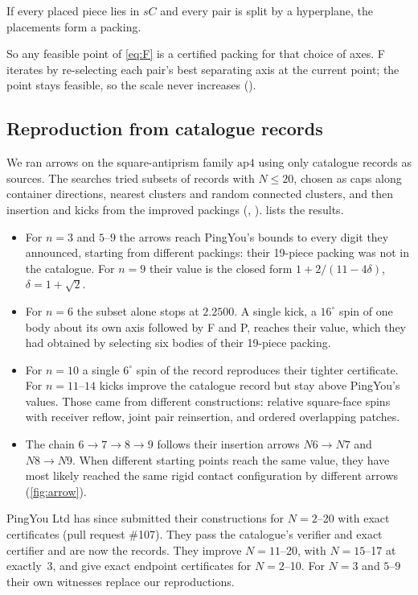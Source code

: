 \documentclass[11pt,a4paper]{article}
\begin{document}
\begin{theorem}\label{thm:sep}
If every placed piece lies in $sC$ and every pair is split by a hyperplane, the placements form a packing.
\end{theorem}

So any feasible point of \eqref{eq:F} is a certified packing for that choice of axes. F iterates by re-selecting each pair's best separating axis at the current point; the point stays feasible, so the scale never increases ().

\subsection{Reproduction from catalogue records}
We ran arrows on the square-antiprism family $\mathrm{ap4}$ using only catalogue records as sources. The searches tried subsets of records with $N\le20$, chosen as caps along container directions, nearest clusters and random connected clusters, and then insertion and kicks from the improved packings (, ).  lists the results.
\begin{itemize}
\item For $n=3$ and $5$--$9$ the arrows reach PingYou's bounds to every digit they announced, starting from different packings: their 19-piece packing was not in the catalogue. For $n=9$ their value is the closed form $1+2/(11-4\delta)$, $\delta=1+\sqrt2$.
\item For $n=6$ the subset alone stops at $2.2500$. A single kick, a $16^\circ$ spin of one body about its own axis followed by F and P, reaches their value, which they had obtained by selecting six bodies of their 19-piece packing.
\item For $n=10$ a single $6^\circ$ spin of the record reproduces their tighter certificate. For $n=11$--$14$ kicks improve the catalogue record but stay above PingYou's values. Those came from different constructions: relative square-face spins with receiver reflow, joint pair reinsertion, and ordered overlapping patches.
\item The chain $6\to7\to8\to9$ follows their insertion arrows $N6\to N7$ and $N8\to N9$. When different starting points reach the same value, they have most likely reached the same rigid contact configuration by different arrows (\cref{fig:arrow}).
\end{itemize}
PingYou Ltd has since submitted their constructions for $N=2$--20 with exact certificates (pull request \#107). They pass the catalogue's verifier and exact certifier and are now the records. They improve $N=11$--20, with $N=15$--17 at exactly~3, and give exact endpoint certificates for $N=2$--10. For $N=3$ and $5$--$9$ their own witnesses replace our reproductions.
\end{document}
